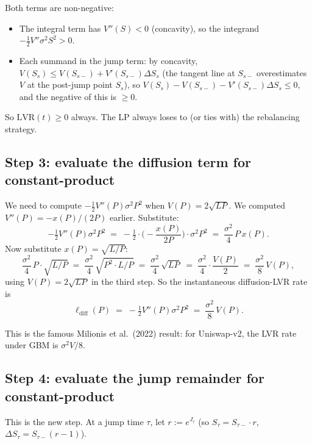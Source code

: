 \documentclass[11pt]{article}
\theoremstyle{definition}
\theoremstyle{remark}
\newcommand{\1}{\mathbf{1}}
\begin{document}
Both terms are non-negative:
\begin{itemize}[leftmargin=2em]
\item The integral term has $V''(S) < 0$ (concavity), so the integrand $-\tfrac{1}{2}V''\sigma^2 S^2 > 0$.
\item Each summand in the jump term: by concavity, $V(S_s) \le V(S_{s-}) + V'(S_{s-})\Delta S_s$ (the tangent line at $S_{s-}$ overestimates $V$ at the post-jump point $S_s$), so $V(S_s) - V(S_{s-}) - V'(S_{s-})\Delta S_s \le 0$, and the negative of this is $\ge 0$.
\end{itemize}

So $\mathrm{LVR}(t) \ge 0$ always. The LP always loses to (or ties with) the rebalancing strategy.

\subsection{Step 3: evaluate the diffusion term for constant-product}

We need to compute $-\tfrac{1}{2}V''(P)\sigma^2 P^2$ when $V(P) = 2\sqrt{LP}$. We computed $V''(P) = -x(P)/(2P)$ earlier. Substitute:
\[
-\tfrac{1}{2}V''(P)\sigma^2 P^2 \;=\; -\tfrac{1}{2}\cdot \Big(-\frac{x(P)}{2P}\Big)\cdot \sigma^2 P^2 \;=\; \frac{\sigma^2}{4}\,P\,x(P).
\]
Now substitute $x(P) = \sqrt{L/P}$:
\[
\frac{\sigma^2}{4}\,P \cdot \sqrt{L/P} \;=\; \frac{\sigma^2}{4}\,\sqrt{P^2 \cdot L/P} \;=\; \frac{\sigma^2}{4}\,\sqrt{LP} \;=\; \frac{\sigma^2}{4}\cdot \frac{V(P)}{2} \;=\; \frac{\sigma^2}{8}\,V(P),
\]
using $V(P) = 2\sqrt{LP}$ in the third step. So the instantaneous diffusion-LVR rate is
\begin{equation}\label{eq:diff-rate}
\ell_{\text{diff}}(P) \;=\; -\tfrac{1}{2}V''(P)\sigma^2 P^2 \;=\; \frac{\sigma^2}{8}\,V(P).
\end{equation}

This is the famous Milionis et al.\ (2022) result: for Uniswap-v2, the LVR rate under GBM is $\sigma^2 V/8$.

\subsection{Step 4: evaluate the jump remainder for constant-product}

This is the new step. At a jump time $\tau$, let $r := e^{J_\tau}$ (so $S_\tau = S_{\tau-} \cdot r$, $\Delta S_\tau = S_{\tau-}(r - 1)$).
\end{document}
